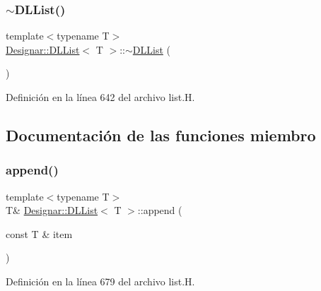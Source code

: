 \mbox{\label{class_designar_1_1_d_l_list_a095cfa30b7eba01f1dc7e3fe6d35f013}} 
\subsubsection{\texorpdfstring{$\sim$\+D\+L\+List()}{~DLList()}}
{\footnotesize\ttfamily template$<$typename T$>$ \\
\hyperlink{class_designar_1_1_d_l_list}{Designar\+::\+D\+L\+List}$<$ T $>$\+::$\sim$\hyperlink{class_designar_1_1_d_l_list}{D\+L\+List} (\begin{DoxyParamCaption}{ }\end{DoxyParamCaption})\hspace{0.3cm}{\ttfamily [inline]}}



Definición en la línea 642 del archivo list.\+H.



\subsection{Documentación de las funciones miembro}
\mbox{\label{class_designar_1_1_d_l_list_a0999bcc1ce1d5b89d54c9993735dc469}} 
\subsubsection{\texorpdfstring{append()}{append()}\hspace{0.1cm}{\footnotesize\ttfamily [1/2]}}
{\footnotesize\ttfamily template$<$typename T$>$ \\
T\& \hyperlink{class_designar_1_1_d_l_list}{Designar\+::\+D\+L\+List}$<$ T $>$\+::append (\begin{DoxyParamCaption}\item[{const T \&}]{item }\end{DoxyParamCaption})\hspace{0.3cm}{\ttfamily [inline]}}



Definición en la línea 679 del archivo list.\+H.


